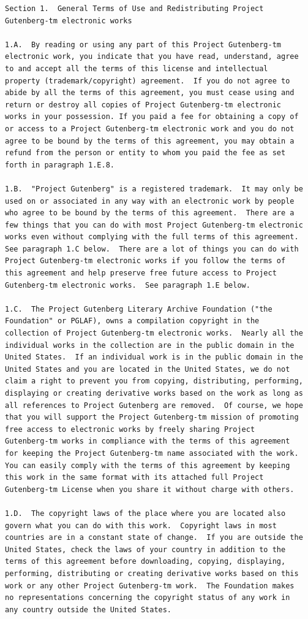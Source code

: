 \documentclass[a4paper,12pt]{book}[2004/02/16]
\theoremstyle{ilemma}
\theoremstyle{itheorem}
\theoremstyle{iother}
\theoremstyle{icorollary}
\theoremstyle{numcorollary}
\theoremstyle{idefinition}
\begin{document}
\begin{verbatim}
Section 1.  General Terms of Use and Redistributing Project
Gutenberg-tm electronic works

1.A.  By reading or using any part of this Project Gutenberg-tm
electronic work, you indicate that you have read, understand, agree
to and accept all the terms of this license and intellectual
property (trademark/copyright) agreement.  If you do not agree to
abide by all the terms of this agreement, you must cease using and
return or destroy all copies of Project Gutenberg-tm electronic
works in your possession. If you paid a fee for obtaining a copy of
or access to a Project Gutenberg-tm electronic work and you do not
agree to be bound by the terms of this agreement, you may obtain a
refund from the person or entity to whom you paid the fee as set
forth in paragraph 1.E.8.

1.B.  "Project Gutenberg" is a registered trademark.  It may only be
used on or associated in any way with an electronic work by people
who agree to be bound by the terms of this agreement.  There are a
few things that you can do with most Project Gutenberg-tm electronic
works even without complying with the full terms of this agreement.
See paragraph 1.C below.  There are a lot of things you can do with
Project Gutenberg-tm electronic works if you follow the terms of
this agreement and help preserve free future access to Project
Gutenberg-tm electronic works.  See paragraph 1.E below.

1.C.  The Project Gutenberg Literary Archive Foundation ("the
Foundation" or PGLAF), owns a compilation copyright in the
collection of Project Gutenberg-tm electronic works.  Nearly all the
individual works in the collection are in the public domain in the
United States.  If an individual work is in the public domain in the
United States and you are located in the United States, we do not
claim a right to prevent you from copying, distributing, performing,
displaying or creating derivative works based on the work as long as
all references to Project Gutenberg are removed.  Of course, we hope
that you will support the Project Gutenberg-tm mission of promoting
free access to electronic works by freely sharing Project
Gutenberg-tm works in compliance with the terms of this agreement
for keeping the Project Gutenberg-tm name associated with the work.
You can easily comply with the terms of this agreement by keeping
this work in the same format with its attached full Project
Gutenberg-tm License when you share it without charge with others.

1.D.  The copyright laws of the place where you are located also
govern what you can do with this work.  Copyright laws in most
countries are in a constant state of change.  If you are outside the
United States, check the laws of your country in addition to the
terms of this agreement before downloading, copying, displaying,
performing, distributing or creating derivative works based on this
work or any other Project Gutenberg-tm work.  The Foundation makes
no representations concerning the copyright status of any work in
any country outside the United States.


\end{verbatim}
\end{document}

